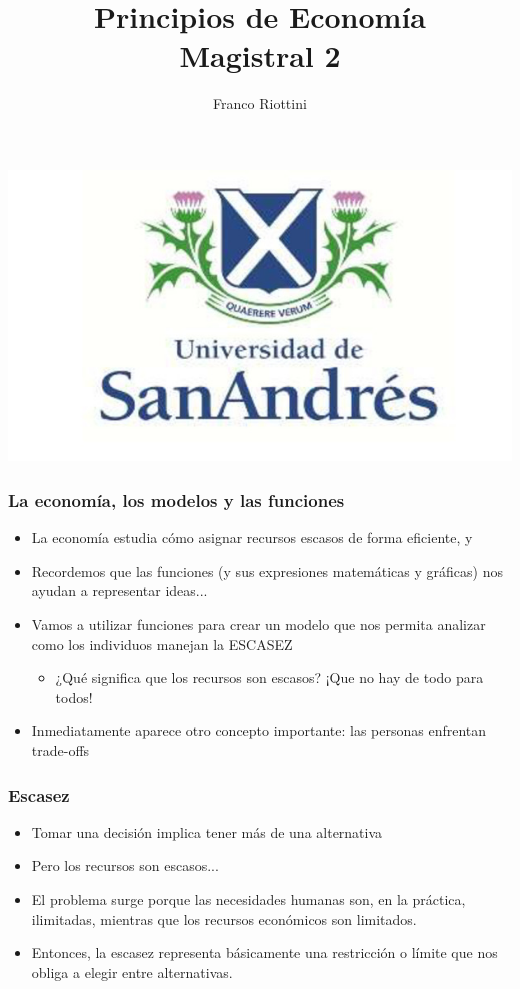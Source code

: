 \documentclass{beamer}
\title[Principios de Economía]{Principios de Economía \vspace{4mm}
\\ Magistral 2}
\date{}
\author[Riottini]{Franco Riottini}
\institute[]{Universidad de San Andrés}
\begin{document}
\begin{frame}
\titlepage
\centering
\includegraphics[scale=0.2]{../Figures/logoUDESA.jpg} 
\end{frame}


\begin{frame}
\frametitle{La economía, los modelos y las funciones}
\begin{itemize}
    \item La economía estudia cómo asignar recursos escasos de forma eficiente, y \vspace{2mm}
    \item Recordemos que las funciones (y sus expresiones matemáticas y gráficas) nos ayudan a representar ideas... \vspace{2mm}
    \item Vamos a utilizar funciones para crear un modelo que nos permita analizar como los individuos manejan la ESCASEZ 
    \begin{itemize}
        \item ¿Qué significa que los recursos son escasos? ¡Que no hay de todo para todos! 
    \end{itemize}
    \item Inmediatamente aparece otro concepto importante: las personas enfrentan trade-offs
\end{itemize} 
\end{frame}

\begin{frame}
\frametitle{Escasez}
\begin{itemize}
    \item Tomar una decisión implica tener más de una alternativa \vspace{2mm}
    \item Pero los recursos son escasos...  
    \item El problema surge porque las necesidades humanas son, en la práctica, ilimitadas, mientras que los recursos económicos son limitados. 
    \item Entonces, la escasez representa básicamente una restricción o límite que nos obliga a elegir entre alternativas.
    \vspace{2mm}
\end{itemize} 
\end{frame}
\end{document}
